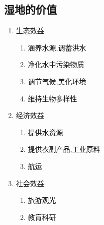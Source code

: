 \documentclass[a4paper]{article}
\begin{document}
    \subsection{湿地的价值}
    \begin{enumerate}
        \item 生态效益
        \begin{enumerate}
            \item 涵养水源,调蓄洪水
            \item 净化水中污染物质
            \item 调节气候,美化环境
            \item 维持生物多样性
        \end{enumerate}
        \item 经济效益
        \begin{enumerate}
            \item 提供水资源
            \item 提供农副产品,工业原料
            \item 航运
        \end{enumerate}
        \item 社会效益
        \begin{enumerate}
            \item 旅游观光
            \item 教肓科研
        \end{enumerate}
    \end{enumerate}
\end{document}

